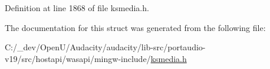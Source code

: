 Definition at line 1868 of file ksmedia.\+h.



The documentation for this struct was generated from the following file\+:\begin{DoxyCompactItemize}
\item 
C\+:/\+\_\+dev/\+Open\+U/\+Audacity/audacity/lib-\/src/portaudio-\/v19/src/hostapi/wasapi/mingw-\/include/\hyperlink{ksmedia_8h}{ksmedia.\+h}\end{DoxyCompactItemize}
